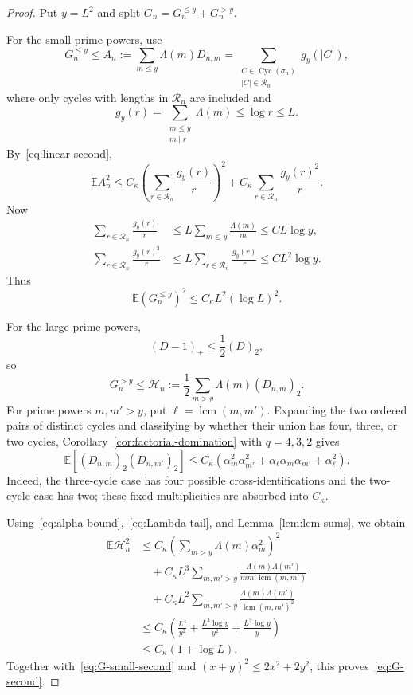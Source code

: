 \documentclass[11pt]{article}
\theoremstyle{remark}
\newcommand{\Ee}{\mathbb E}
\newcommand{\lcm}{\operatorname{lcm}}
\newcommand{\Cyc}{\operatorname{Cyc}}
\begin{document}
\begin{proof}
Put $y=L^2$ and split $G_n=G_n^{\le y}+G_n^{>y}$.

For the small prime powers, use
\[
 G_n^{\le y}
 \le A_n:=\sum_{m\le y}\Lambda(m)D_{n,m}
 =\sum_{\substack{C\in\Cyc(\sigma_n)\\|C|\in\mathcal R_n}}g_y(|C|),
\]
where only cycles with lengths in $\mathcal R_n$ are included and
\[
 g_y(r)=\sum_{\substack{m\le y\\m\mid r}}\Lambda(m)\le\log r\le L.
\]
By~\eqref{eq:linear-second},
\[
 \Ee A_n^2
 \le C_\kappa\left(\sum_{r\in\mathcal R_n}\frac{g_y(r)}r\right)^2
 +C_\kappa\sum_{r\in\mathcal R_n}\frac{g_y(r)^2}r.
\]
Now
\begin{align*}
 \sum_{r\in\mathcal R_n}\frac{g_y(r)}r
 &\le L\sum_{m\le y}\frac{\Lambda(m)}m
 \le C L\log y,\\
 \sum_{r\in\mathcal R_n}\frac{g_y(r)^2}r
 &\le L\sum_{r\in\mathcal R_n}\frac{g_y(r)}r
 \le C L^2\log y.
\end{align*}
Thus
\begin{equation}
\label{eq:G-small-second}
 \Ee(G_n^{\le y})^2\le C_\kappa L^2(\log L)^2.
\end{equation}

For the large prime powers,
\[
 (D-1)_+\le\frac12(D)_2,
\]
so
\begin{equation}
\label{eq:Hn}
 G_n^{>y}\le \mathcal H_n:=\frac12\sum_{m>y}\Lambda(m)(D_{n,m})_2.
\end{equation}
For prime powers $m,m'>y$, put $\ell=\lcm(m,m')$.  Expanding the two
ordered pairs of distinct cycles and classifying by whether their union
has four, three, or two cycles, Corollary~\ref{cor:factorial-domination}
with $q=4,3,2$ gives
\begin{equation}
\label{eq:D2D2}
 \Ee[(D_{n,m})_2(D_{n,m'})_2]
 \le C_\kappa\left(
 \alpha_m^2\alpha_{m'}^2
 +\alpha_\ell\alpha_m\alpha_{m'}
 +\alpha_\ell^2
 \right).
\end{equation}
Indeed, the three-cycle case has four possible cross-identifications and
the two-cycle case has two; these fixed multiplicities are absorbed into
$C_\kappa$.

Using~\eqref{eq:alpha-bound},~\eqref{eq:Lambda-tail}, and
Lemma~\ref{lem:lcm-sums}, we obtain
\begin{align*}
 \Ee\mathcal H_n^2
 &\le C_\kappa
 \left(\sum_{m>y}\Lambda(m)\alpha_m^2\right)^2\\
 &\quad+C_\kappa L^3
 \sum_{m,m'>y}
 \frac{\Lambda(m)\Lambda(m')}{mm'\lcm(m,m')}\\
 &\quad+C_\kappa L^2
 \sum_{m,m'>y}
 \frac{\Lambda(m)\Lambda(m')}{\lcm(m,m')^2}\\
 &\le C_\kappa\left(
 \frac{L^4}{y^2}
 +\frac{L^3\log y}{y^2}
 +\frac{L^2\log y}{y}
 \right)\\
 &\le C_\kappa(1+\log L).
\end{align*}
Together with~\eqref{eq:G-small-second} and
$(x+y)^2\le2x^2+2y^2$, this proves~\eqref{eq:G-second}.
\end{proof}
\end{document}
